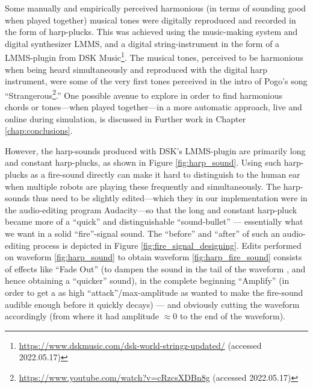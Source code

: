 			Some manually and empirically perceived harmonious (in terms of sounding good when played together) musical tones were digitally reproduced and recorded in the form of harp-plucks. This was achieved using the music-making system and digital synthesizer LMMS, and a digital string-instrument in the form of a LMMS-plugin from DSK Music\footnote{\url{https://www.dskmusic.com/dsk-world-stringz-updated/} (accessed 2022.05.17)}. The musical tones, perceived to be harmonious when being heard simultaneously and reproduced with the digital harp instrument, were some of the very first tones perceived in the intro of Pogo's song ``Strangerous\footnote{\url{https://www.youtube.com/watch?v=cRzcsXDBn8g} (accessed 2022.05.17)}.'' One possible avenue to explore in order to find harmonious chords or tones—when played together—in a more automatic approach, live and online during simulation, is discussed in Further work in Chapter \ref{chap:conclusions}.
			
			However, the harp-sounds produced with DSK's LMMS-plugin are primarily long and constant harp-plucks, as shown in Figure \ref{fig:harp_sound}. Using such harp-plucks as a fire-sound directly can make it hard to distinguish to the human ear when multiple robots are playing these frequently and simultaneously. The harp-sounds thus need to be slightly edited—which they in our implementation were in the audio-editing program Audacity—so that the long and constant harp-pluck became more of a ``quick'' and distinguishable ``sound-bullet'' — essentially what we want in a solid ``fire''-signal sound. The ``before'' and ``after'' of such an audio-editing process is depicted in Figure \ref{fig:fire_signal_designing}. Edits performed on waveform \ref{fig:harp_sound} to obtain waveform \ref{fig:harp_fire_sound} consists of effects like ``Fade Out'' (to dampen the sound in the tail of the waveform , and hence obtaining a ``quicker'' sound), in the complete beginning ``Amplify'' (in order to get a as high ``attack''/max-amplitude as wanted to make the fire-sound audible enough before it quickly decays) — and obviously cutting the waveform accordingly (from where it had amplitude $\approx 0$ to the end of the waveform).
			
